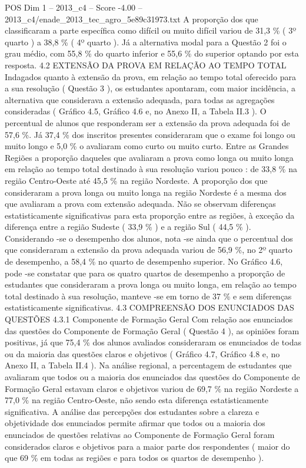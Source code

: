 \begin{textsample}{POS Dim 1 – 2013\_c4 – Score -4.00 – 2013\_c4/enade\_2013\_tec\_agro\_5e89c31973.txt}
A proporção dos que classificaram a parte específica como difícil ou muito difícil variou de 31,3 \% ( 3º quarto ) a 38,8 \% ( 4º quarto ).
Já a alternativa modal para a Questão 2 foi o grau médio, com 55,8 \% do quarto inferior e 55,6 \% do superior optando por esta resposta. 4.2 EXTENSÃO DA PROVA EM RELAÇÃO AO TEMPO TOTAL Indagados quanto à extensão da prova, em relação ao tempo total oferecido para a sua resolução ( Questão 3 ), os estudantes apontaram, com maior incidência, a alternativa que considerava a extensão adequada, para todas as agregações consideradas ( Gráfico 4.5, Gráfico 4.6 e, no Anexo II, a Tabela II.3 ).
O percentual de alunos que responderam ser a extensão da prova adequada foi de 57,6 \%.
Já 37,4 \% dos inscritos presentes consideraram que o exame foi longo ou muito longo e 5,0 \% o avaliaram como curto ou muito curto.
Entre as Grandes Regiões a proporção daqueles que avaliaram a prova como longa ou muito longa em relação ao tempo total destinado à sua resolução variou pouco : de 33,8 \% na região Centro-Oeste até 45,5 \% na região Nordeste.
A proporção dos que consideraram a prova longa ou muito longa na região Nordeste é a mesma dos que avaliaram a prova com extensão adequada.
Não se observam diferenças estatisticamente significativas para esta proporção entre as regiões, à exceção da diferença entre a região Sudeste ( 33,9 \% ) e a região Sul ( 44,5 \% ).
Considerando -se o desempenho dos alunos, nota -se ainda que o percentual dos que consideraram a extensão da prova adequada variou de 56,9 \%, no 2º quarto de desempenho, a 58,4 \% no quarto de desempenho superior.
No Gráfico 4.6, pode -se constatar que para os quatro quartos de desempenho a proporção de estudantes que consideraram a prova longa ou muito longa, em relação ao tempo total destinado à sua resolução, manteve -se em torno de 37 \% e sem diferenças estatisticamente significativas. 4.3 COMPREENSÃO DOS ENUNCIADOS DAS QUESTÕES 4.3.1 Componente de Formação Geral Com relação aos enunciados das questões do Componente de Formação Geral ( Questão 4 ), as opiniões foram positivas, já que 75,4 \% dos alunos avaliados consideraram os enunciados de todas ou da maioria das questões claros e objetivos ( Gráfico 4.7, Gráfico 4.8 e, no Anexo II, a Tabela II.4 ).
Na análise regional, a percentagem de estudantes que avaliaram que todos ou a maioria dos enunciados das questões do Componente de Formação Geral estavam claros e objetivos variou de 69,7 \% na região Nordeste a 77,0 \% na região Centro-Oeste, não sendo esta diferença estatisticamente significativa.
A análise das percepções dos estudantes sobre a clareza e objetividade dos enunciados permite afirmar que todos ou a maioria dos enunciados de questões relativas ao Componente de Formação Geral foram considerados claros e objetivos para a maior parte dos respondentes ( maior do que 69 \% em todas as regiões e para todos os quartos de desempenho ).

\end{textsample}
